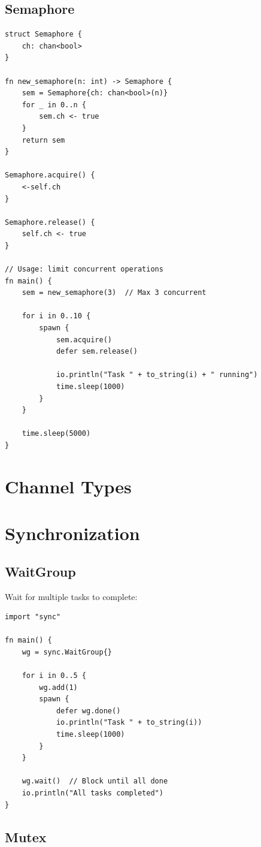 \subsection{Semaphore}

\begin{lstlisting}
struct Semaphore {
    ch: chan<bool>
}

fn new_semaphore(n: int) -> Semaphore {
    sem = Semaphore{ch: chan<bool>(n)}
    for _ in 0..n {
        sem.ch <- true
    }
    return sem
}

Semaphore.acquire() {
    <-self.ch
}

Semaphore.release() {
    self.ch <- true
}

// Usage: limit concurrent operations
fn main() {
    sem = new_semaphore(3)  // Max 3 concurrent

    for i in 0..10 {
        spawn {
            sem.acquire()
            defer sem.release()

            io.println("Task " + to_string(i) + " running")
            time.sleep(1000)
        }
    }

    time.sleep(5000)
}
\end{lstlisting}

\section{Channel Types}

\section{Synchronization}

\subsection{WaitGroup}

Wait for multiple tasks to complete:

\begin{lstlisting}
import "sync"

fn main() {
    wg = sync.WaitGroup{}

    for i in 0..5 {
        wg.add(1)
        spawn {
            defer wg.done()
            io.println("Task " + to_string(i))
            time.sleep(1000)
        }
    }

    wg.wait()  // Block until all done
    io.println("All tasks completed")
}
\end{lstlisting}

\subsection{Mutex}

